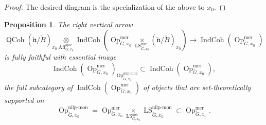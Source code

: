 \documentclass[10pt]{amsart}
\newtheorem{prop}[subsubsection]{Proposition}
\theoremstyle{remark}
\newcommand{\on}[1]{\operatorname{#1}}
\newcommand{\QCoh}{\on{QCoh}}
\newcommand{\IndCoh}{\on{IndCoh}}
\newcommand{\Gcheck}{\check{G}}
\newcommand{\ncheck}{\check{\mathfrak{n}}}
\newcommand{\Bcheck}{\check{B}}
\begin{document}
\begin{proof}
The desired diagram is the specialization of the above to $x_0$.
\end{proof}

\begin{prop}
    The right vertical arrow
    $$
    \QCoh(\ncheck/\Bcheck)_{x_0} \underset{\on{Aff}_{G, x_0}^{\on{spec}}}{\otimes} \IndCoh(\on{Op}_{\Gcheck, x_0}^{\on{mer}} \underset{\on{LS}_{\Gcheck, x_0}^{\on{mer}}}{\times} (\ncheck/\Bcheck)_{x_0}) \longrightarrow 
    \IndCoh(\on{Op}_{\Gcheck, x_0}^{\on{mer}})
    $$
    is fully faithful with essential image
    $$
    \IndCoh(\on{Op}_{\Gcheck, x_0}^{\on{mer}})_{\on{Op}_{\Gcheck, x_0}^{\on{nilp-mon}}} \subset \IndCoh(\on{Op}_{\Gcheck, x_0}^{\on{mer}}),
    $$
    the full subcategory of $\IndCoh(\on{Op}_{\Gcheck, x_0}^{\on{mer}})$ of objects that are set-theoretically supported on
    $$
    \on{Op}_{\Gcheck, x_0}^{\on{nilp-mon}} = \on{Op}_{\Gcheck, x_0}^{\on{mer}} \underset{\on{LS}_{\Gcheck, x_0}^{\on{mer}}}{\times} \on{LS}_{\Gcheck, x_0}^{\on{nilp-mon}} \subset \on{Op}_{\Gcheck, x_0}^{\on{mer}}.
    $$
\end{prop}
\end{document}
